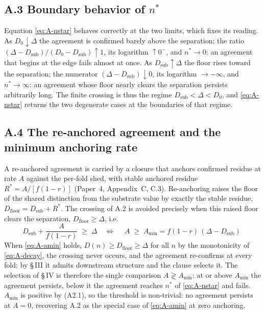 \documentclass[11pt,oneside]{report}
\theoremstyle{definition}
\theoremstyle{remark}
\begin{document}
\subsection*{A.3 Boundary behavior of \texorpdfstring{$n^{*}$}{n*}}

Equation \eqref{eq:A-nstar} behaves correctly at the two limits, which fixes its
reading. As \ensuremath{D_0 \downarrow \Delta} the agreement is confirmed barely above
the separation; the ratio \ensuremath{(\Delta - D_{\mathrm{sub}})/(D_0 -
D_{\mathrm{sub}}) \uparrow 1}, its logarithm \ensuremath{\uparrow 0^{-}}, and
\ensuremath{n^{*} \to 0}: an agreement that begins at the edge fails almost at once. As
\ensuremath{D_{\mathrm{sub}} \uparrow \Delta} the floor rises toward the separation;
the numerator \ensuremath{(\Delta - D_{\mathrm{sub}}) \downarrow 0}, its logarithm
\ensuremath{\to -\infty}, and \ensuremath{n^{*} \to \infty}: an agreement whose floor
nearly clears the separation persists arbitrarily long. The finite crossing is thus the
regime \ensuremath{D_{\mathrm{sub}} < \Delta < D_0}, and \eqref{eq:A-nstar} returns the
two degenerate cases at the boundaries of that regime.

\subsection*{A.4 The re-anchored agreement and the minimum anchoring rate}

A re-anchored agreement is carried by a closure that anchors confirmed residue at rate
\ensuremath{A} against the per-fold shed, with stable anchored residue
\ensuremath{R^{*} = A/[f(1-r)]} (Paper~4, Appendix~C, C.3). Re-anchoring raises the
floor of the shared distinction from the substrate value by exactly the stable residue,
\ensuremath{D_{\mathrm{floor}} = D_{\mathrm{sub}} + R^{*}}. The crossing of A.2 is
avoided precisely when this raised floor clears the separation,
\ensuremath{D_{\mathrm{floor}} \geq \Delta}, i.e.
\begin{equation}
D_{\mathrm{sub}} + \frac{A}{f(1-r)} \;\geq\; \Delta
\quad\Longleftrightarrow\quad
\boxed{\;A \;\geq\; A_{\min} = f(1-r)\,(\Delta - D_{\mathrm{sub}})\;}
\label{eq:A-amin}
\end{equation}
When \eqref{eq:A-amin} holds, \ensuremath{D(n) \geq D_{\mathrm{floor}} \geq \Delta} for
all \ensuremath{n} by the monotonicity of \eqref{eq:A-decay}, the crossing never
occurs, and the agreement re-confirms at every fold; by \S\,III it admits downstream
structure and the clause selects it. The selection of \S\,IV is therefore the single
comparison \ensuremath{A \gtrless A_{\min}}: at or above \ensuremath{A_{\min}} the
agreement persists, below it the agreement reaches \ensuremath{n^{*}} of
\eqref{eq:A-nstar} and fails. \ensuremath{A_{\min}} is positive by (A2.1), so the
threshold is non-trivial: no agreement persists at \ensuremath{A = 0}, recovering A.2 as
the special case of \eqref{eq:A-amin} at zero anchoring.
\end{document}

